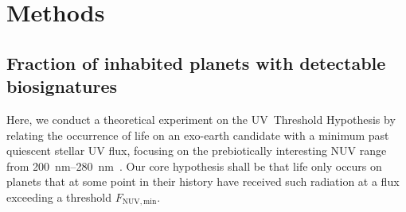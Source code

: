 \documentclass[twocolumn,twocolappendix,linenumbers]{aastex631}
\begin{document}

\section{Methods}
\label{sec:methods}

\subsection{Fraction of inhabited planets with detectable biosignatures}
%
%
Here, we conduct a theoretical experiment on the UV~Threshold Hypothesis by relating the occurrence of life on an exo-earth candidate with a minimum past quiescent stellar \gls{UV} flux, focusing on the prebiotically interesting \gls{NUV} range from \SIrange{200}{280}{\nano\meter}~\citep{Ranjan2016}.
Our core hypothesis shall be that life only occurs on planets that at some point in their history have received such radiation at a flux exceeding a threshold $F_\mathrm{NUV, min}$.
\end{document}
